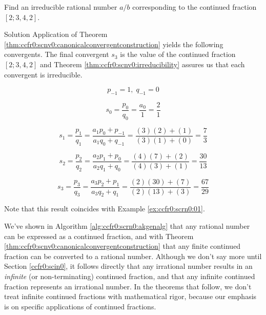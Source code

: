 \begin{vworkexamplestatement}
\label{ex:ccfr0:scrn0:abreconstruction:01}
Find an irreducible rational number $a/b$ corresponding to the
continued fraction $[2;3,4,2]$.
\end{vworkexamplestatement}
\begin{vworkexampleparsection}{Solution}
Application of Theorem \ref{thm:ccfr0:scnv0:canonicalconvergentconstruction}
yields the following convergents.  The final convergent $s_3$ is the
value of the continued fraction $[2;3,4,2]$ and Theorem
\ref{thm:ccfr0:scnv0:irreducibility} assures us that each convergent is 
irreducible.

\begin{equation}
\label{eq:ccfr0:scrn0:02a}
p_{-1} = 1, \; q_{-1} = 0
\end{equation}

\begin{equation}
\label{eq:ccfr0:scrn0:02b}
s_0 = \frac{p_0}{q_0} = \frac{a_0}{1} = \frac{2}{1}
\end{equation}

\begin{equation}
\label{eq:ccfr0:scrn0:02c}
s_1 = \frac{p_1}{q_1} = \frac{a_1 p_0 + p_{-1}}{a_1 q_0 + q_{-1}}
    = \frac{(3)(2) + (1)}{(3)(1)+(0)}
    = \frac{7}{3}
\end{equation}

\begin{equation}
\label{eq:ccfr0:scrn0:02d}
s_2 = \frac{p_2}{q_2} = \frac{a_2 p_1 + p_{0}}{a_2 q_1 + q_{0}}
    = \frac{(4)(7) + (2)}{(4)(3)+(1)}
    = \frac{30}{13}
\end{equation}

\begin{equation}
\label{eq:ccfr0:scrn0:02e}
s_3 = \frac{p_3}{q_3} = \frac{a_3 p_2 + p_{1}}{a_3 q_2 + q_{1}}
    = \frac{(2)(30) + (7)}{(2)(13)+(3)}
    = \frac{67}{29}
\end{equation}

Note that this result coincides with 
Example \ref{ex:ccfr0:scrn0:01}.
\end{vworkexampleparsection}
\vworkexamplefooter{}

We've shown in Algorithm \ref{alg:ccfr0:scrn0:akgenalg}
that any rational number can be expressed as a continued fraction, and
with Theorem \ref{thm:ccfr0:scnv0:canonicalconvergentconstruction}
that any finite continued fraction can be converted to a rational
number.  Although we don't say more until Section \ref{ccfr0:scin0},
it follows directly that any irrational number results in 
an \emph{infinite} (or non-terminating) continued fraction, and that
any infinite continued fraction represents an irrational number.
In the theorems that follow, we don't treat infinite continued
fractions with mathematical rigor, because our emphasis is on
specific applications of continued fractions.

